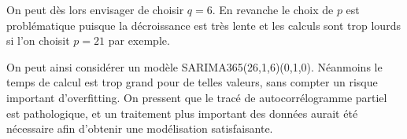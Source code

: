 \documentclass[../report.tex]{subfiles}
\begin{document}
\par On peut dès lors envisager de choisir $q = 6$. En revanche le choix de $p$ est problématique puisque la décroissance est très lente et les calculs sont trop lourds si l’on choisit $p = 21$ par exemple.

\par On peut ainsi considérer un modèle SARIMA365(26,1,6)(0,1,0). Néanmoins le temps de calcul est trop grand pour de telles valeurs, sans compter un risque important d’overfitting. On pressent que le tracé de autocorrélogramme partiel est pathologique, et un traitement plus important des données aurait été nécessaire afin d’obtenir une modélisation satisfaisante.
\end{document}
